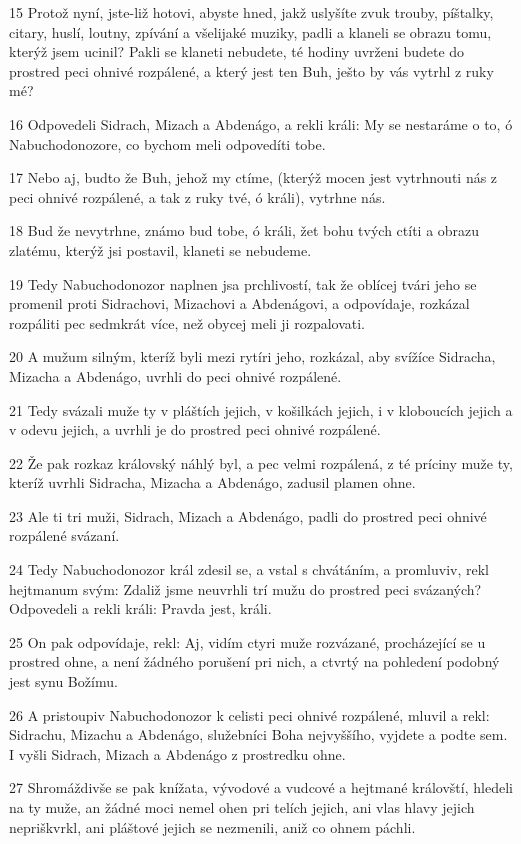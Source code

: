 \par 15 Protož nyní, jste-liž hotovi, abyste hned, jakž uslyšíte zvuk trouby, píštalky, citary, huslí, loutny, zpívání a všelijaké muziky, padli a klaneli se obrazu tomu, kterýž jsem ucinil? Pakli se klaneti nebudete, té hodiny uvrženi budete do prostred peci ohnivé rozpálené, a který jest ten Buh, ješto by vás vytrhl z ruky mé?
\par 16 Odpovedeli Sidrach, Mizach a Abdenágo, a rekli králi: My se nestaráme o to, ó Nabuchodonozore, co bychom meli odpovedíti tobe.
\par 17 Nebo aj, budto že Buh, jehož my ctíme, (kterýž mocen jest vytrhnouti nás z peci ohnivé rozpálené, a tak z ruky tvé, ó králi), vytrhne nás.
\par 18 Bud že nevytrhne, známo bud tobe, ó králi, žet bohu tvých ctíti a obrazu zlatému, kterýž jsi postavil, klaneti se nebudeme.
\par 19 Tedy Nabuchodonozor naplnen jsa prchlivostí, tak že oblícej tvári jeho se promenil proti Sidrachovi, Mizachovi a Abdenágovi, a odpovídaje, rozkázal rozpáliti pec sedmkrát více, než obycej meli ji rozpalovati.
\par 20 A mužum silným, kteríž byli mezi rytíri jeho, rozkázal, aby svížíce Sidracha, Mizacha a Abdenágo, uvrhli do peci ohnivé rozpálené.
\par 21 Tedy svázali muže ty v pláštích jejich, v košilkách jejich, i v kloboucích jejich a v odevu jejich, a uvrhli je do prostred peci ohnivé rozpálené.
\par 22 Že pak rozkaz královský náhlý byl, a pec velmi rozpálená, z té príciny muže ty, kteríž uvrhli Sidracha, Mizacha a Abdenágo, zadusil plamen ohne.
\par 23 Ale ti tri muži, Sidrach, Mizach a Abdenágo, padli do prostred peci ohnivé rozpálené svázaní.
\par 24 Tedy Nabuchodonozor král zdesil se, a vstal s chvátáním, a promluviv, rekl hejtmanum svým: Zdaliž jsme neuvrhli trí mužu do prostred peci svázaných? Odpovedeli a rekli králi: Pravda jest, králi.
\par 25 On pak odpovídaje, rekl: Aj, vidím ctyri muže rozvázané, procházející se u prostred ohne, a není žádného porušení pri nich, a ctvrtý na pohledení podobný jest synu Božímu.
\par 26 A pristoupiv Nabuchodonozor k celisti peci ohnivé rozpálené, mluvil a rekl: Sidrachu, Mizachu a Abdenágo, služebníci Boha nejvyššího, vyjdete a podte sem. I vyšli Sidrach, Mizach a Abdenágo z prostredku ohne.
\par 27 Shromáždivše se pak knížata, vývodové a vudcové a hejtmané královští, hledeli na ty muže, an žádné moci nemel ohen pri telích jejich, ani vlas hlavy jejich nepriškvrkl, ani pláštové jejich se nezmenili, aniž co ohnem páchli.
